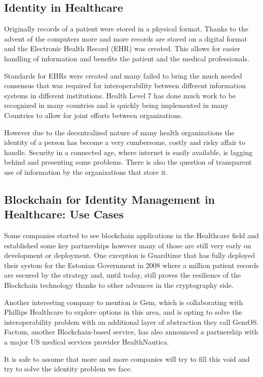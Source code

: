\documentclass[notitlepage]{llncs}
\begin{document}

\subsection{Identity in Healthcare}
Originally records of a patient were stored in a physical format. Thanks to the advent of the computers more and more records are stored on a digital format and the Electronic Health Record (EHR) was created. This allows for easier handling of information and benefits the patient and the medical professionals.
\par
Standards for EHRs were created and many failed to bring the much needed consensus that was required for interoperability between different information systems in different institutions. Health Level 7 has done much work to be recognized in many countries and is quickly being implemented in many Countries to allow for joint efforts between organizations.
\par
However due to the decentralized nature of many health organizations the identity of a person has become a very cumbersome, costly and risky affair to handle. Security in a connected age, where internet is easily available, is lagging behind and presenting some problems. There is also the question of transparent use of information by the organizations that store it.



\subsection{Blockchain for Identity Management in Healthcare: Use Cases}
Some companies started to see blockchain applications in the Healthcare field and established some key partnerships however many of those are still very early on development or deployment. One exception is Guardtime that has fully deployed their system for the Estonian Government in 2008 where a million patient records are secured by the strategy and, until today, still proves the resilience of the Blockchain technology thanks to other advances in the cryptography side.
\par
Another interesting company to mention is Gem, which is collaborating with Phillips Healthcare to explore options in this area, and is opting to solve the interoperability problem with an additional layer of abstraction they call GemOS. Factom, another Blockchain-based service, has also announced a partnership with a major US medical services provider HealthNautica.\cite{BlockchainCompHealth2017,FactomPartnership2017}
\par
It is safe to assume that more and more companies will try to fill this void and try to solve the identity problem we face.
\end{document}

